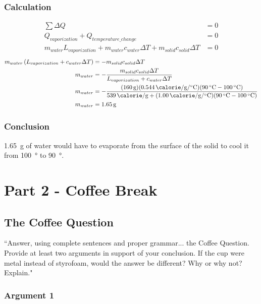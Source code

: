 \documentclass{article}
\begin{document}
\subsubsection{Calculation}

\begin{align*}
	\sum \Delta Q & = 0 \\
	Q_{vaporization} + Q_{temperature\_change} & = 0 \\
	m_{water}L_{vaporization} + m_{water}c_{water}\Delta T + m_{solid}c_{solid}\Delta T & = 0
\end{align*}
\begin{align*}
	m_{water} \left( L_{vaporization} + c_{water}\Delta T \right) & = - m_{solid}c_{solid}\Delta T \\
	m_{water} & = - \frac{ m_{solid}c_{solid}\Delta T }{ L_{vaporization} + c_{water}\Delta T } \\
	m_{water} & = - \frac{ (\SI{160}{\gram})(\SI{0.544}{\calorie \per \gram \per \celsius})(\SI{90}{\celsius} - \SI{100}{\celsius}) }{ \SI{539}{\calorie \per \gram} + (\SI{1.00}{\calorie \per \gram \per \celsius})(\SI{90}{\celsius} - \SI{100}{\celsius}) } \\
	m_{water} & = \SI{1.65}{\gram}
\end{align*}

\subsubsection{Conclusion}

\SI{1.65}{\gram} of water would have to evaporate from the surface of the solid to cool it from \SI{100}{\degree} to \SI{90}{\degree}.

\section{Part 2 - Coffee Break}

\subsection{The Coffee Question}

``Answer, using complete sentences and proper grammar... the Coffee Question. Provide at least two arguments in support of your conclusion. If the cup were metal instead of styrofoam, would the answer be different? Why or why not? Explain."

\subsubsection{Argument 1}
\end{document}
